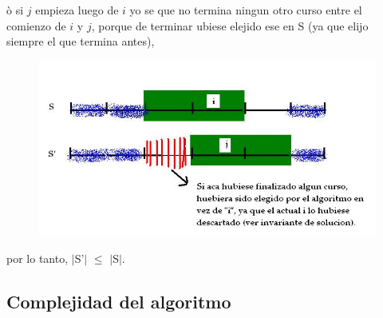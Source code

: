 \begin{itemize}
\begin{itemize}
ò si $j$ empieza luego de $i$ yo se que no termina ningun otro curso entre el comienzo de $i$ y $j$, porque de terminar ubiese elejido ese en S  (ya que elijo siempre el que termina antes), 

\begin{figure}[H] %
\begin{center}
\includegraphics[width=322pt]{../imgs/demo22.jpg}
\end{center}
\end{figure}

\end{itemize}

por lo tanto, $|$S'$|$ $\leq$ $|$S$|$. 


\subsection{Complejidad del algoritmo}


\end{itemize}
